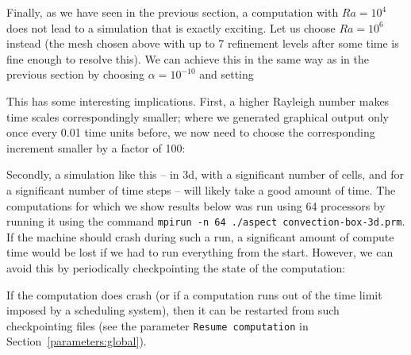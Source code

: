 \documentclass{article}
\begin{document}
Finally, as we have seen in the previous section, a computation with $Ra=10^4$
does not lead to a simulation that is exactly exciting. Let us choose $Ra=10^6$
instead (the mesh chosen above with up to 7 refinement levels after some time
is fine enough to resolve this). We can achieve this in the same way as in the
previous section by choosing $\alpha=10^{-10}$ and setting

This has some interesting implications. First, a higher Rayleigh number makes
time scales correspondingly smaller; where we generated graphical output only
once every 0.01 time units before, we now need to choose the corresponding
increment smaller by a factor of 100:

Secondly, a simulation like this -- in 3d, with a significant number of cells,
and for a significant number of time steps -- will likely take a good amount of
time. The computations for which we show results below was run using 64
processors by running it using the command
{\tt{mpirun -n 64 ./aspect convection-box-3d.prm}}. If the machine should crash
during such a run, a significant amount of compute time would be lost if we had
to run everything from the start. However, we can avoid this by periodically
checkpointing the state of the computation:

If the computation does crash (or if a computation runs out of the time limit
imposed by a scheduling system), then it can be restarted from such
checkpointing files (see the parameter {\tt Resume computation}
in Section~\ref{parameters:global}).
\end{document}

